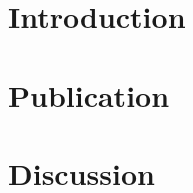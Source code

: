 \documentclass[11pt, numbers=noenddot, titlepage, a4paper, twoside, onecolumn, DIV=calc]{scrbook} %
\begin{document}
\clearpage

\pagestyle{scrheadings} %



\tableofcontents %


\listoffigures %


\listoftables %



\clearpage


\mainmatter %


\pagestyle{raphimen}




\part{Introduction}

 
%
% 
% 
% 
% 






\part{Publication}
\renewcommand{\cftdot}{}







\part{Discussion}



\pagestyle{raphimen}


%
\end{document}
